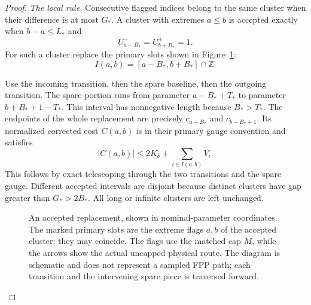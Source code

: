\begin{proof}
\emph{The local rule.}
Consecutive flagged indices belong to the same cluster when their
difference is at most $G_*$. A cluster with extremes $a\leq b$ is
accepted exactly when $b-a\leq L_*$ and
\[
 U_{a-B_*}^-=U_{b+B_*}^+=1.
\]
For such a cluster replace the primary slots shown in
Figure~\ref{improvement:fig-replacement}:
\begin{equation}
 I(a,b)=[a-B_*,b+B_*]\cap\mathbb Z.
 \label{improvement:flags:eq2}
\end{equation}

Use the incoming transition, then the spare baseline, then the outgoing
transition. The spare portion runs from parameter $a-B_*+T_*$ to
parameter $b+B_*+1-T_*$. This interval has nonnegative length because
$B_*>T_*$. The endpoints of the whole replacement are precisely
$c_{a-B_*}$ and $c_{b+B_*+1}$. Its normalized corrected cost
$C(a,b)$ is in their primary gauge convention and satisfies
\begin{equation}
 |C(a,b)|\leq2K_\delta+\sum_{i\in I(a,b)}V_i.
 \label{improvement:flags:eq3}
\end{equation}
This follows by exact telescoping through the two transitions and the
spare gauge. Different accepted intervals are disjoint because
distinct clusters have gap greater than $G_*>2B_*$. All long or infinite
clusters are left unchanged.

\begin{figure}[htbp]
\centering
{}
\caption{An accepted replacement, shown in nominal-parameter
coordinates. The marked primary slots are the extreme flags $a,b$ of
the accepted cluster; they may coincide. The flags use the matched cap
$M$, while the arrows show the actual uncapped physical route. The
diagram is schematic and does not represent a sampled FPP path; each
transition and the intervening spare piece is traversed forward.}
\label{improvement:fig-replacement}
\end{figure}


\end{proof}

